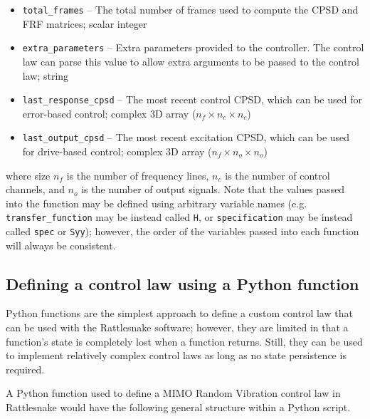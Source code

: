 \documentclass[pdf,12pt,report]{SANDreport}
\newcommand{\inlineCode}{\lstinline[basicstyle=\bfseries\ttfamily]}
\begin{document}
\begin{itemize}
        \item \inlineCode{total_frames} -- The total number of frames used to compute the \Ac{CPSD} and \Ac{FRF} matrices; scalar integer
 
        \item \inlineCode{extra_parameters} -- Extra parameters provided to the controller.  The control law can parse this value to allow extra arguments to be passed to the control law; string
        
        \item \inlineCode{last_response_cpsd} -- The most recent control \Ac{CPSD}, which can be used for error-based control; complex 3D array ($n_{f} \times n_{c}\times n_{c}$)
        
        \item \inlineCode{last_output_cpsd} -- The most recent excitation \Ac{CPSD}, which can be used for drive-based control; complex 3D array ($n_{f} \times n_{o}\times n_{o}$)
    \end{itemize}
    
    where size $n_f$ is the number of frequency lines, $n_c$ is the number of control channels, and $n_o$ is the number of output signals.  Note that the values passed into the function may be defined using arbitrary variable names (e.g. \inlineCode{transfer_function} may be instead called \inlineCode{H}, or \inlineCode{specification} may be instead called \inlineCode{spec} or \inlineCode{Syy}); however, the order of the variables passed into each function will always be consistent.

    \subsection{Defining a control law using a Python function}
    Python functions are the simplest approach to define a custom control law that can be used with the Rattlesnake software; however, they are limited in that a function's state is completely lost when a function returns.  Still, they can be used to implement relatively complex control laws as long as no state persistence is required.
    
    A Python function used to define a \Ac{MIMO} Random Vibration control law in Rattlesnake would have the following general structure within a Python script.
    
\end{document}
